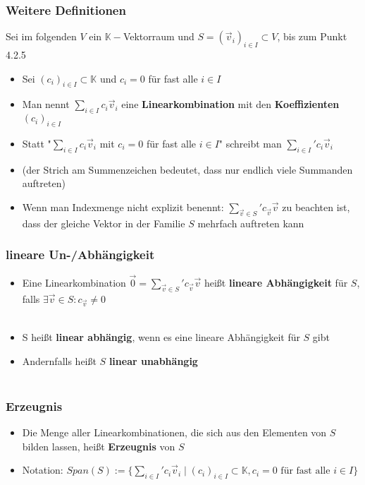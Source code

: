 \documentclass[titlepage]{article}
\newcommand{\K}{\mathbb{K}}
\newcommand{\1}{\mathbb{1}}
\newcommand{\0}{\mathbb{0}}
\begin{document}
				\subsubsection{Weitere Definitionen}
					Sei im folgenden $V$ ein $\K-$Vektorraum und $S=(\vec{v}_i)_{i\in I}\subset V$, bis zum Punkt 4.2.5
					\begin{itemize}
						\item Sei $(c_i)_{i\in I}\subset\K$ und $c_i=0$ für fast alle $i\in I$
						\item Man nennt $\sum\limits_{i\in I}c_i\vec{v}_i$ eine \textbf{Linearkombination} mit den \textbf{Koeffizienten} $(c_i)_{i\in I}$
						\item Statt "$\sum\limits_{i\in I}c_i\vec{v}_i$ mit $c_i=0$ für fast alle $i\in I$" schreibt man $\sum\limits_{i\in I}\text{$'$}c_i\vec{v}_i$\\
						\item (der Strich am Summenzeichen bedeutet, dass nur endlich viele Summanden auftreten)
						\item Wenn man Indexmenge nicht explizit benennt: $\sum\limits_{\vec{v}\in S}\text{$'$} c_{\vec{v}}\vec{v}$ zu beachten ist, dass der gleiche Vektor in der Familie $S$ mehrfach auftreten kann
					\end{itemize}
				\subsubsection{lineare Un-/Abhängigkeit}
					\begin{itemize}
						\item Eine Linearkombination $\vec{0}=\sum\limits_{\vec{v}\in S}\text{$'$}c_{\vec{v}}\vec{v}$ heißt \textbf{lineare Abhängigkeit} für $S$, falls $\exists\vec{v}\in S:c_{\vec{v}}\neq0$\\\\
						\item S heißt \textbf{linear abhängig}, wenn es eine lineare Abhängigkeit für $S$ gibt
						\item Andernfalls heißt $S$ \textbf{linear unabhängig}\\\\
					\end{itemize}
				\subsubsection{Erzeugnis}
					\begin{itemize}
						\item Die Menge aller Linearkombinationen, die sich aus den Elementen von $S$ bilden lassen, heißt \textbf{Erzeugnis} von $S$
						\item Notation: $Span(S):=\{\sum\limits_{i\in I}\text{$'$}c_i\vec{v}_i\mid(c_i)_{i\in I}\subset\K,c_i=0\text{ für fast alle }i\in I\}$
					\end{itemize}
\end{document}
